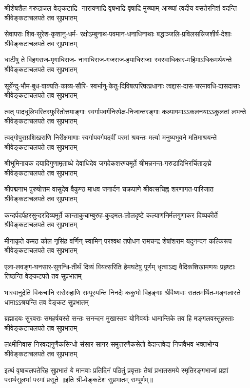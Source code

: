 \fourlineindentedshloka
{श्रीशेषशैल-गरुडाचल-वेङ्कटाद्रि-}
{नारायणाद्रि-वृषभाद्रि-वृषाद्रि-मुख्याम्}
{आख्यां त्वदीय वसतेरनिशं वदन्ति}
{श्रीवेङ्कटाचलपते तव सुप्रभातम्}

\fourlineindentedshloka
{सेवापराः शिव-सुरेश-कृशानु-धर्म-}
{रक्षोऽम्बुनाथ-पवमान-धनाधिनाथाः}
{बद्धाञ्जलि-प्रविलसन्निजशीर्ष-देशाः}
{श्रीवेङ्कटाचलपते तव सुप्रभातम्}

\fourlineindentedshloka
{धाटीषु ते विहगराज-मृगाधिराज-}
{नागाधिराज-गजराज-हयाधिराजाः}
{स्वस्वाधिकार-महिमाऽधिकमर्थयन्ते}
{श्रीवेङ्कटाचलपते तव सुप्रभातम्}

\fourlineindentedshloka
{सूर्येन्दु-भौम-बुध-वाक्पति-काव्य-सौरि-}
{स्वर्भानु-केतु-दिविषत्परिषत्प्रधानाः}
{त्वद्दास-दास-चरमावधि-दासदासाः}
{श्रीवेङ्कटाचलपते तव सुप्रभातम्}

\fourlineindentedshloka
{त्वत् पादधूलिभरितस्फुरितोत्तमाङ्गाः}
{स्वर्गापवर्गनिरपेक्ष-निजान्तरङ्गाः}
{कल्पागमाऽऽकलनयाऽऽकुलतां लभन्ते}
{श्रीवेङ्कटाचलपते तव सुप्रभातम्}

\fourlineindentedshloka
{त्वद्गोपुराग्रशिखराणि निरीक्षमाणाः}
{स्वर्गापवर्गपदवीं परमां श्रयन्तः}
{मर्त्या मनुष्यभुवने मतिमाश्रयन्ते}
{श्रीवेङ्कटाचलपते तव सुप्रभातम्}

\fourlineindentedshloka
{श्रीभूमिनायक दयादिगुणामृताब्धे}
{देवाधिदेव जगदेकशरण्यमूर्ते}
{श्रीमन्ननन्त-गरुडादिभिरर्चिताङ्घ्रे}
{श्रीवेङ्कटाचलपते तव सुप्रभातम्}

\fourlineindentedshloka
{श्रीपद्मनाभ पुरुषोत्तम वासुदेव}
{वैकुण्ठ माधव जनार्दन चक्रपाणे}
{श्रीवत्सचिह्न शरणागत-पारिजात}
{श्रीवेङ्कटाचलपते तव सुप्रभातम्}

\fourlineindentedshloka
{कन्दर्पदर्पहरसुन्दरदिव्यमूर्ते}
{कान्ताकुचाम्बुरुह-कुड्मल-लोलदृष्टे}
{कल्याणनिर्मलगुणाकर दिव्यकीर्ते}
{श्रीवेङ्कटाचलपते तव सुप्रभातम्}

\fourlineindentedshloka
{मीनाकृते कमठ कोल नृसिंह वर्णिन्}
{स्वामिन् परश्वथ तपोधन रामचन्द्र}
{शेषांशराम यदुनन्दन कल्किरूप}
{श्रीवेङ्कटाचलपते तव सुप्रभातम्}

\fourlineindentedshloka
{एला-लवङ्ग-घनसार-सुगन्धि-तीर्थं}
{दिव्यं वियत्सरिति हेमघटेषु पूर्णम्}
{धृत्वाऽद्य वैदिकशिखामणयः प्रहृष्टाः}
{तिष्ठन्ति वेङ्कटपते तव सुप्रभातम्}

\fourlineindentedshloka
{भास्वानुदेति विकचानि सरोरुहाणि}
{सम्पूरयन्ति निनदैः ककुभो विहङ्गाः}
{श्रीवैष्णवाः सततमर्थित-मङ्गलास्ते}
{धामाऽऽश्रयन्ति तव वेङ्कट सुप्रभातम्}

\fourlineindentedshloka
{ब्रह्मादयः सुरवराः समहर्षयस्ते}
{सन्तः सनन्दन मुखास्तव योगिवर्याः}
{धामान्तिके तव हि मङ्गलवस्तुहस्ताः}
{श्रीवेङ्कटाचलपते तव सुप्रभातम्}

\fourlineindentedshloka
{लक्ष्मीनिवास निरवद्यगुणैकसिन्धो}
{संसार-सागर-समुत्तरणैकसेतो}
{वेदान्तवेद्य निजवैभव भक्तभोग्य}
{श्रीवेङ्कटाचलपते तव सुप्रभातम्}

\fourlineindentedshloka
{इत्थं वृषाचलपतेरिह सुप्रभातं}
{ये मानवाः प्रतिदिनं पठितुं प्रवृत्ताः}
{तेषां प्रभातसमये स्मृतिरङ्गभाजां}
{प्रज्ञां परार्थसुलभां परमां प्रसूते}
॥इति श्री-वेङ्कटेश सुप्रभातम् सम्पूर्णम्॥